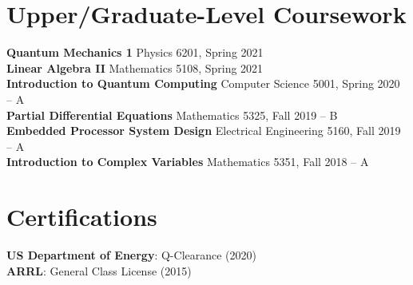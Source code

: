 \documentclass[letterpaper,11pt]{article}
\makeatletter
\newcommand{\resumeItem}[1]{
  \item\small{
    {#1 \vspace{-2pt}}
  }
}
\newcommand{\resumeProjectHeading}[2]{
    \item
    \begin{tabular*}{0.97\textwidth}{l@{\extracolsep{\fill}}r}
      \small#1 & #2 \\
    \end{tabular*}\vspace{-7pt}
}
\newcommand{\resumeSubHeadingListStart}{\begin{itemize}[leftmargin=0.15in, label={}]}
\newcommand{\resumeSubHeadingListEnd}{\end{itemize}}
\newcommand{\resumeItemListStart}{\begin{itemize}}
\newcommand{\resumeItemListEnd}{\end{itemize}\vspace{-5pt}}
\makeatother
\begin{document}
\section{Upper/Graduate-Level Coursework}
\begin{itemize}[leftmargin=0.15in, label={}]
	\small{\item{
			\textbf{Quantum Mechanics 1}{ Physics 6201, Spring 2021} \\
			\textbf{Linear Algebra II}{ Mathematics 5108, Spring 2021}\\
			\textbf{Introduction to Quantum Computing}{ Computer Science 5001, Spring 2020 -- A} \\
			\textbf{Partial Differential Equations}{ Mathematics 5325, Fall 2019 -- B}\\
			\textbf{Embedded Processor System Design}{ Electrical Engineering 5160, Fall 2019 -- A}\\
			\textbf{Introduction to Complex Variables}{ Mathematics 5351, Fall 2018 -- A} \\
			
			
	}}
\end{itemize}

\section{Certifications}
\begin{itemize}[leftmargin=0.15in, label={}]
	\small{\item{
			\textbf{US Department of Energy}{: Q-Clearance (2020)}\\
			\textbf{ARRL}{: General Class License (2015)}	
	}}
\end{itemize}

\begin{comment}
\section{Projects}
    \resumeSubHeadingListStart
      \resumeProjectHeading
          {\textbf{Gitlytics} $|$ \emph{Python, Flask, React, PostgreSQL, Docker}}{June 2020 -- Present}
          \resumeItemListStart
            \resumeItem{Developed a full-stack web application using with Flask serving a REST API with React as the frontend}
            \resumeItem{Implemented GitHub OAuth to get data from user’s repositories}
            \resumeItem{Visualized GitHub data to show collaboration}
            \resumeItem{Used Celery and Redis for asynchronous tasks}
          \resumeItemListEnd
    \resumeSubHeadingListEnd
\end{comment}
\end{document}
